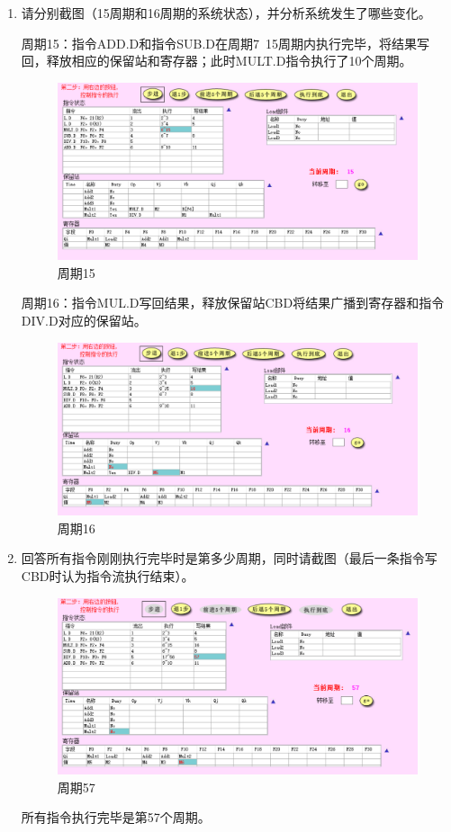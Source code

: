 \documentclass{ctexart}
\begin{document}
\begin{enumerate}
    \item 请分别截图（15周期和16周期的系统状态），并分析系统发生了哪些变化。
          \par 周期15：指令ADD.D和指令SUB.D在周期7~15周期内执行完毕，将结果写回，释放相应的保留站和寄存器；此时MULT.D指令执行了10个周期。
          \begin{figure}[H]
              \centering
              \includegraphics[scale=0.3]{zq15.png}
              \caption{周期15}
          \end{figure}
          \par 周期16：指令MUL.D写回结果，释放保留站CBD将结果广播到寄存器和指令DIV.D对应的保留站。
          \begin{figure}[H]
              \centering
              \includegraphics[scale=0.3]{zq16.png}
              \caption{周期16}
          \end{figure}
    \item 回答所有指令刚刚执行完毕时是第多少周期，同时请截图（最后一条指令写CBD时认为指令流执行结束）。
          \begin{figure}[H]
              \centering
              \includegraphics[scale=0.3]{zq57.png}
              \caption{周期57}
          \end{figure}
          \par
          所有指令执行完毕是第57个周期。
\end{enumerate}
\end{document}
